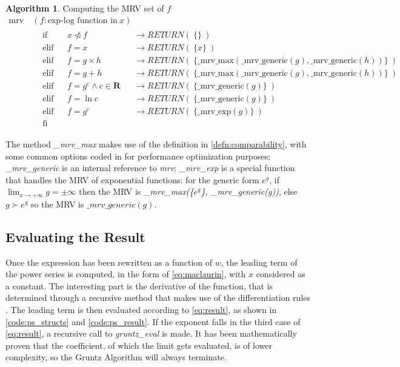 \documentclass{article}
\theoremstyle{plain}
\theoremstyle{definition}
\theoremstyle{algorithm}
\newtheorem*{algo*}{Algorithm}
\begin{document}
	\begin{algo*}
		Computing the MRV set of \(f\)
		\[
		\begin{aligned}
			\text{mrv}\:&(f : \text{exp-log function in} \: x) \\
			&\begin{aligned}
				&\text{if} &&x \ntriangleleft f && \rightarrow RETURN(\:\{\}\:) \\
				&\text{elif} &&f = x && \rightarrow RETURN(\:\{x\}\:) \\
				&\text{elif} &&f = g \times h && \rightarrow RETURN(\:\{\text{\_mrv\_max}(\text{\_mrv\_generic}(g), \text{\_mrv\_generic}(h))\}\:) \\
				&\text{elif} &&f = g + h && \rightarrow RETURN(\:\{\text{\_mrv\_max}(\text{\_mrv\_generic}(g), \text{\_mrv\_generic}(h))\}\:) \\
				&\text{elif} &&f = g^{c} \wedge c \in \mathbf{R} && \rightarrow RETURN(\:\{\text{\_mrv\_generic}(g)\}\:) \\
				&\text{elif} &&f = \ln{c} && \rightarrow RETURN(\:\{\text{\_mrv\_generic}(g)\}\:) \\
				&\text{elif} &&f = g^{c} && \rightarrow RETURN(\:\{\text{\_mrv\_exp}(g)\}\:) \\
				&\text{fi}
			\end{aligned}
		\end{aligned}
		\]
	\end{algo*}
	
	The method \textit{\_mrv\_max} makes use of the definition in \eqref{defn:comparability}, with some common options coded in for performance optimization purposes; \textit{\_mrv\_generic} is an internal reference to \textit{mrv}; \textit{\_mrv\_exp} is a special function that handles the MRV  of exponential functions: for the generic form \(e^{g}\), if \(\lim_{x \to +\infty}{g} = \pm\infty\) then the MRV is \textit{\_mrv\_max(\{\(e^{g}\)\}, \_mrv\_generic(g))}, else \(g \succ e^{g}\) so the MRV is \(\_mrv\_generic(g)\).
	
	\subsection{Evaluating the Result}
	
	Once the expression has been rewritten as a function of \(w\), the leading term of the power series is computed, in the form of \eqref{eq:maclaurin}, with \(x\) considered as a constant. The interesting part is the derivative of the function, that is determined through a recursive method that makes use of the differentiation rules \cite{wiki:diffrules}.
	The leading term is then evaluated according to \eqref{eq:result}, as shown in \cref{code:ps_structs} and \cref{code:ps_result}.
	If the exponent falls in the third case of \eqref{eq:result}, a recursive call to \textit{gruntz\_eval} is made. It has been mathematically proven that the coefficient, of which the limit gets evaluated, is of lower complexity, so the Gruntz Algorithm will always terminate.
	
\end{document}
